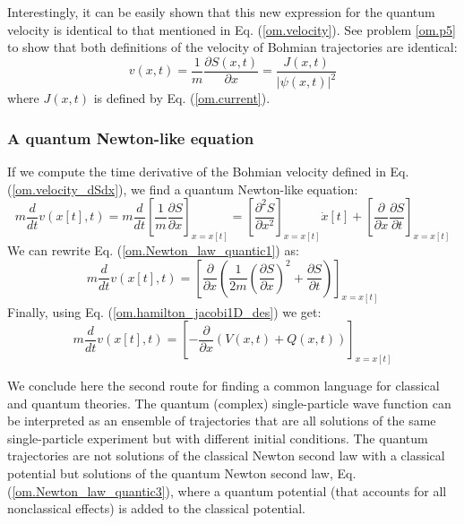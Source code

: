 \documentclass[nofootinbib, secnumarabic, amsmath, nobibnotes,10pt,aps,pra]{revtex4-1}
\newcommand{\eref}[1]{Eq. (\ref{#1})}
\begin{document}
Interestingly, it can be easily shown that this new expression for
the quantum velocity is identical to that mentioned in
\eref{om.velocity}. See problem \ref{om.p5} to show that both
definitions of the velocity of Bohmian trajectories are identical:
\begin{equation}
v(x,t) = \frac {1} {m} \frac {\partial S(x,t)} {\partial x} = \frac{J(x,t)} {|\psi(x,t)|^2}
\label{om.velocity2}
\end{equation}
where $J(x,t)$ is defined by \eref{om.current}.

\subsubsection{A quantum Newton-like equation}

If we compute the time derivative of the Bohmian velocity defined in \eref{om.velocity_dSdx}, we find a quantum Newton-like equation:
\begin{equation}
\label{om.Newton_law_quantic1}
m\frac {d} {dt} v(x[t],t)\! =\! m \frac {d} {dt} \left[ \frac{1}{m} \frac {\partial S} {\partial x} \right]_{x = x[t]} \!=\! \left[ \frac {\partial^2 S} {\partial x^2}\right]_{x = x[t]} \dot{x}[t] + \left[\frac {\partial} {\partial x} \frac {\partial S} {\partial t} \right]_{x = x[t]}
\end{equation}
We can rewrite \eref{om.Newton_law_quantic1} as:
\begin{equation}
\label{om.Newton_law_quantic2}
m\frac {d} {dt} v(x[t],t) = \left[ \frac {\partial} {\partial x} \left(\frac {1} {2m} \left(\frac {\partial S} {\partial x} \right)^{2} + \frac {\partial S} {\partial t} \right) \right]_{x = x[t]}
\end{equation}
Finally, using \eref{om.hamilton_jacobi1D_des} we get:
\begin{equation}
\label{om.Newton_law_quantic3}
m\frac {d} {dt} v(x[t],t) = \left[ -\frac {\partial} {\partial x} \left(V(x,t) + Q(x,t) \right) \right]_{x = x[t]}
\end{equation}

We conclude here the second route for finding a common language for
classical and quantum theories. The quantum (complex)
single-particle wave function can be interpreted as an ensemble of
trajectories that are all solutions of the same single-particle
experiment but with different initial conditions. The quantum
trajectories are not solutions of the classical Newton second  law with a
classical potential but solutions of the quantum Newton second law,
\eref{om.Newton_law_quantic3}, where a quantum potential (that
accounts for all nonclassical effects) is added to the classical
potential.
\end{document}

